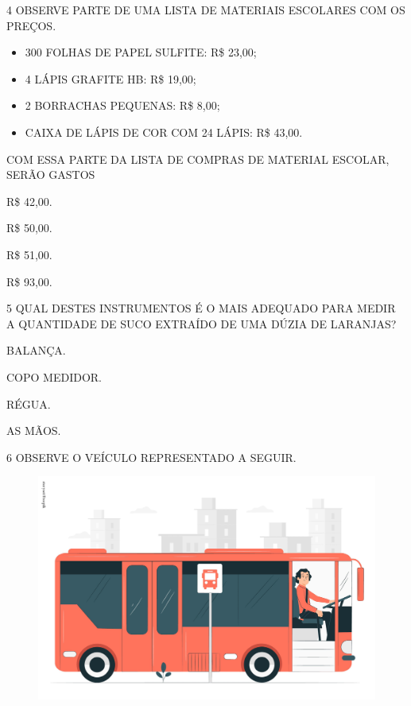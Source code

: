 \num{4} OBSERVE PARTE DE UMA LISTA DE MATERIAIS ESCOLARES COM OS PREÇOS.

\begin{myquote}
\begin{itemize}
  \item 300 FOLHAS DE PAPEL SULFITE: R\$ 23,00;
  \item 4 LÁPIS GRAFITE HB: R\$ 19,00;
  \item 2 BORRACHAS PEQUENAS: R\$ 8,00;
  \item CAIXA DE LÁPIS DE COR COM 24 LÁPIS: R\$ 43,00.
\end{itemize}
\end{myquote}


COM ESSA PARTE DA LISTA DE COMPRAS DE MATERIAL ESCOLAR, SERÃO GASTOS

\begin{multicols}{2}
\begin{escolha}[itemsep=0pt]
\item R\$ 42,00.

\item R\$ 50,00.

\item R\$ 51,00.

\item R\$ 93,00.
\end{escolha}
\end{multicols}

\num{5} QUAL DESTES INSTRUMENTOS É O MAIS ADEQUADO PARA MEDIR A QUANTIDADE DE SUCO EXTRAÍDO DE UMA DÚZIA DE LARANJAS?

\begin{escolha}[itemsep=0pt]
\item BALANÇA.

\item COPO MEDIDOR.

\item RÉGUA.

\item AS MÃOS.
\end{escolha}

\num{6} OBSERVE O VEÍCULO REPRESENTADO A SEGUIR.
\enlargethispage{2\baselineskip}

\begin{figure}[H]
\centering
\includegraphics[width=.8\textwidth]{./media/SAEB_1ANO_MAT_FIGURA138.png}
\end{figure}

